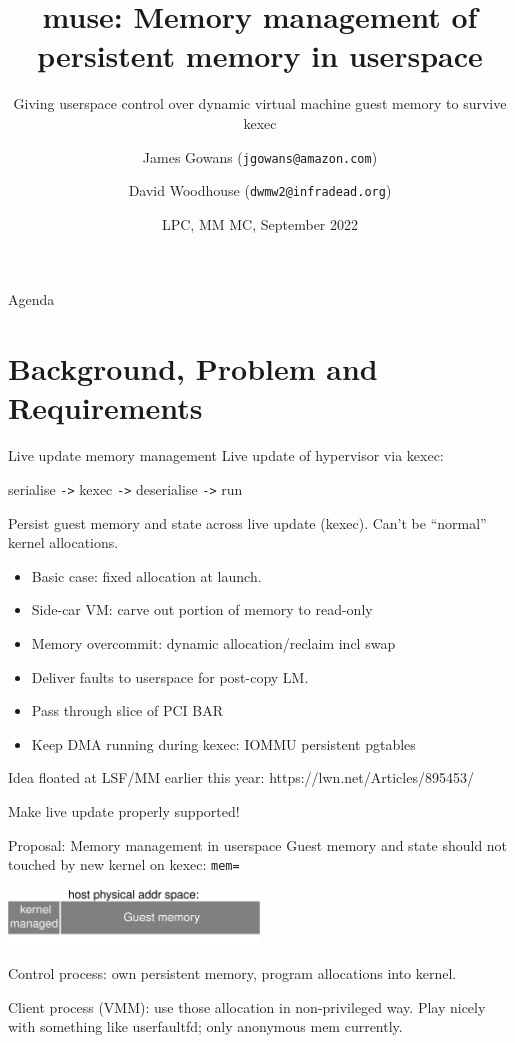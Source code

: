 \documentclass{beamer}
\title{muse: Memory management of persistent memory in userspace}
\subtitle{Giving userspace control over dynamic virtual machine guest memory to survive kexec}
\author[James Gowans \& David Woodhouse (EC2) ]{James Gowans (\texttt{jgowans@amazon.com}) \\ \and David Woodhouse (\texttt{dwmw2@infradead.org})}
\institute{Amazon / AWS / EC2}
\date{LPC, MM MC, September 2022}
\begin{document}
\begin{frame}
\titlepage
\end{frame}


\begin{frame}{Agenda}
  \tableofcontents[hideallsubsections]
\end{frame}


\section{Background, Problem and Requirements}

\begin{frame}{Live update memory management}
    Live update of hypervisor via kexec:

    serialise \texttt{->} kexec \texttt{->} deserialise \texttt{->} run
    
    Persist guest memory and state across live update (kexec). Can't be ``normal'' kernel allocations.
  \begin{itemize}
    \item Basic case: fixed allocation at launch.
    \item Side-car VM: carve out portion of memory to read-only
    \item Memory overcommit: dynamic allocation/reclaim incl swap
    \item Deliver faults to userspace for post-copy LM.
    \item Pass through slice of PCI BAR
    \item Keep DMA running during kexec: IOMMU persistent pgtables
  \end{itemize}
  Idea floated at LSF/MM earlier this year: https://lwn.net/Articles/895453/

  Make live update properly supported!
\end{frame}

\begin{frame}{Proposal: Memory management in userspace}
  Guest memory and state should not touched by new kernel on kexec: \texttt{mem=}
  
  \includegraphics[width=0.5\textwidth]{memmac-memory}

  Control process: own persistent memory, program allocations into kernel.

  Client process (VMM): use those allocation in non-privileged way.
  \newline
  Play nicely with something like userfaultfd; only anonymous mem currently.
\end{frame}
\end{document}
